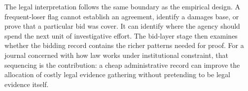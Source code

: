 The legal interpretation follows the same boundary as the
empirical design. A frequent-loser flag cannot establish an
agreement, identify a damages base, or prove that a particular
bid was cover. It can identify where the agency should spend
the next unit of investigative effort. The bid-layer stage then
examines whether the bidding record contains the richer
patterns needed for proof. For a journal concerned with how law
works under institutional constraint, that sequencing is the
contribution: a cheap administrative record can improve the
allocation of costly legal evidence gathering without
pretending to be legal evidence itself.

